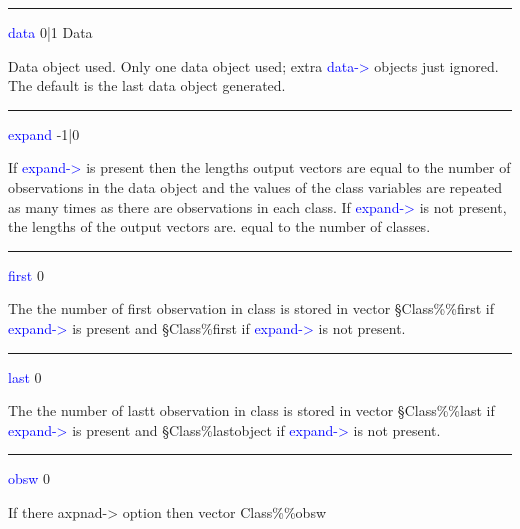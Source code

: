 \vspace{0.3cm}
\hrule
\vspace{0.3cm}
\noindent \textcolor{blue}{data} \tabto{3cm} 0|1 \tabto{5cm}  Data \tabto{7cm}
\begin{changemargin}{3cm}{0cm}
\noindent Data object used. Only one data object used; extra \textcolor{blue}{data->} objects just ignored. The default is the last
data object generated.
\end{changemargin}
\vspace{0.3cm}
\hrule
\vspace{0.3cm}
\noindent \textcolor{blue}{expand} \tabto{3cm} -1|0 \tabto{5cm}    \tabto{7cm}
\begin{changemargin}{3cm}{0cm}
\noindent If \textcolor{blue}{expand->} is present then the lengths output vectors are equal
to the number of observations in the data object and the values of the class variables
are repeated as many times as there are observations in each class. If
\textcolor{blue}{expand->} is not present, the lengths of the output vectors are.
equal to the number of classes.
\end{changemargin}
\vspace{0.3cm}
\hrule
\vspace{0.3cm}
\noindent \textcolor{blue}{first} \tabto{3cm} 0 \tabto{5cm}    \tabto{7cm}
\begin{changemargin}{3cm}{0cm}
\noindent The the number of first observation in class is stored in vector
§Class\%\%first if \textcolor{blue}{expand->} is present and §Class\%first if \textcolor{blue}{expand->} is not present.
\end{changemargin}
\vspace{0.3cm}
\hrule
\vspace{0.3cm}
\noindent \textcolor{blue}{last} \tabto{3cm} 0 \tabto{5cm}    \tabto{7cm}
\begin{changemargin}{3cm}{0cm}
\noindent The the number of lastt observation in class is stored in vector
§Class\%\%last if \textcolor{blue}{expand->} is present and §Class\%lastobject if \textcolor{blue}{expand->} is not present.
\end{changemargin}
\vspace{0.3cm}
\hrule
\vspace{0.3cm}
\noindent \textcolor{blue}{obsw} \tabto{3cm} 0 \tabto{5cm}    \tabto{7cm}
\begin{changemargin}{3cm}{0cm}
\noindent If there axpnad-> option then vector Class\%\%obsw
\end{changemargin}
\vspace{0.3cm}
